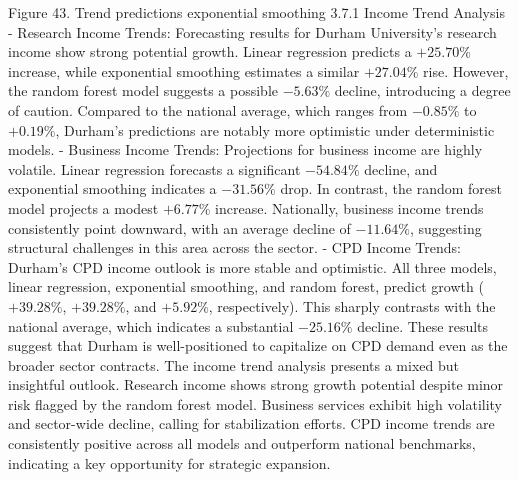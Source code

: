 Figure 43. Trend predictions exponential smoothing
3.7.1 Income Trend Analysis
- Research Income Trends: Forecasting results for Durham University's research income show strong potential growth. Linear regression predicts a $+25.70 \%$ increase, while exponential smoothing estimates a similar $+27.04 \%$ rise. However, the random forest model suggests a possible $-5.63 \%$ decline, introducing a degree of caution. Compared to the national average, which ranges from $-0.85 \%$ to $+0.19 \%$, Durham's predictions are notably more optimistic under deterministic models.
- Business Income Trends: Projections for business income are highly volatile. Linear regression forecasts a significant $-54.84 \%$ decline, and exponential smoothing indicates a $-31.56 \%$ drop. In contrast, the random forest model projects a modest $+6.77 \%$ increase. Nationally, business income trends consistently point downward, with an average decline of $-11.64 \%$, suggesting structural challenges in this area across the sector.
- CPD Income Trends: Durham's CPD income outlook is more stable and optimistic. All three models, linear regression, exponential smoothing, and random forest, predict growth ( $+39.28 \%$, $+39.28 \%$, and $+5.92 \%$, respectively). This sharply contrasts with the national average, which indicates a substantial $-25.16 \%$ decline. These results suggest that Durham is well-positioned to capitalize on CPD demand even as the broader sector contracts.
The income trend analysis presents a mixed but insightful outlook. Research income shows strong growth potential despite minor risk flagged by the random forest model. Business services exhibit high volatility and sector-wide decline, calling for stabilization efforts. CPD income trends are consistently positive across all models and outperform national benchmarks, indicating a key opportunity for strategic expansion.

